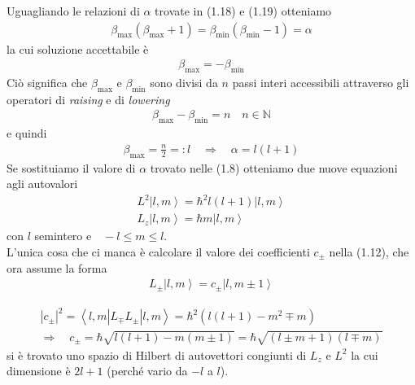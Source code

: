 Uguagliando le relazioni di $\alpha$ trovate in (1.18) e (1.19) otteniamo
\begin{equation}\begin{split}
\beta_{\max}\left(\beta_{\max}+1\right)=\beta_{\min}\left(\beta_{\min}-1\right)=\alpha 
\end{split}\end{equation}
la cui soluzione accettabile è
\begin{equation}\begin{split}
 \beta_{\max}=-\beta_{\min}
 \end{split}\end{equation} 
 Ciò significa che $\beta_{\max}$ e $\beta_{\min}$ sono divisi da $n$ passi interi accessibili attraverso gli operatori di \textit{raising} e di \textit{lowering}
 \begin{equation}\begin{split}
\beta_{\max}-\beta_{\min}=n \quad n\in\mathbb{N}
 \end{split}\end{equation}
 e quindi
 \begin{equation}\begin{split}
\beta_{\max}=\frac{n}{2}=:l \quad\Longrightarrow \quad\boxed{\alpha=l\left(l+1\right)}
\end{split}\end{equation}
Se sostituiamo il valore di $\alpha$ trovato nelle (1.8) otteniamo due nuove equazioni agli autovalori 
\begin{equation}\begin{split}
L^2\left |l,m \right\rangle=\hbar ^2l\left(l+1\right)\left |l,m \right\rangle \\
L_z\left |l,m \right\rangle=\hbar m\left |l,m \right\rangle
\end{split}\end{equation}
con $l$ semintero e$\quad-l\le m\le l$.\\
L'unica cosa che ci manca è calcolare il valore dei coefficienti $c_\pm$ nella (1.12), che ora assume la forma
\begin{equation}\begin{split}
L_\pm\left |l,m \right\rangle=c_\pm\left |l,m\pm 1 \right\rangle
\end{split}\end{equation}

\begin{equation}\begin{split}
|c_\pm|^2=\left\langle l,m|L_\mp L_\pm|l,m \right\rangle
=\hbar ^2\left(l\left(l+1\right)-m^2\mp m\right) \\
\Longrightarrow\quad c_\pm=\hbar \sqrt{l\left(l+1\right)-m\left(m\pm 1\right)}=\hbar \sqrt{\left(l\pm m+1\right)\left(l\mp m\right)}
\end{split}\end{equation}
si è trovato uno spazio di Hilbert di autovettori congiunti di $L_z$ e $L^2$ la cui dimensione è $2l+1$ (perché vario da $-l$ a $l$).

